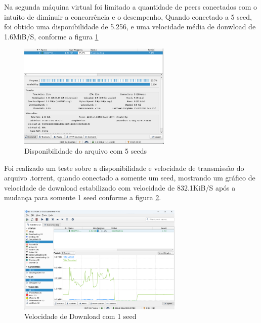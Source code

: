 Na segunda máquina virtual foi limitado a quantidade de peers conectados com o intuito de diminuir a concorrência e o desempenho, Quando conectado a 5 \ac{seed}, foi obtido uma disponibilidade de 5.256, e uma velocidade média de donwload de 1.6MiB/S, conforme a figura \ref{fig:disponibilidade_5_seeds}
\begin{figure}[!htb]
\centering
\includegraphics[width=0.65\textwidth]{./images/disponibilidade 5 seeds.png} 
\caption{Disponibilidade do arquivo com 5 seeds}
\label{fig:disponibilidade_5_seeds}
\end{figure}

Foi realizado um teste sobre a disponibilidade e velocidade de transmissão do arquivo .torrent, quando conectado a somente um seed, mostrando um gráfico de velocidade de download estabilizado com velocidade de 832.1KiB/S após a mudança para somente 1 seed conforme a figura \ref{fig:velocidade_1_seed}.
\begin{figure}[!htb]
\centering
\includegraphics[width=0.7\textwidth]{./images/velocidade download 1 seed.png}
\caption{Velocidade de Download com 1 seed}
\label{fig:velocidade_1_seed}
\end{figure}